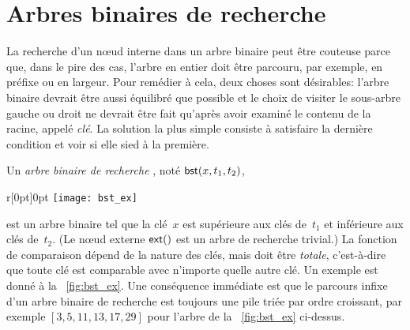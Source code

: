\chapter{Arbres binaires de recherche}

La recherche d'un n{\oe}ud interne dans un arbre binaire peut être
couteuse parce que, dans le pire des cas, l'arbre en entier doit être
parcouru, par exemple, en préfixe ou en largeur. Pour remédier à cela,
deux choses sont désirables: l'arbre binaire devrait être aussi
équilibré que possible et le
choix de visiter le sous-arbre gauche ou droit ne devrait être fait
qu'après avoir examiné le contenu de la racine, appelé
\emph{clé}. La solution la plus simple consiste à
satisfaire la dernière condition et voir si elle sied à la première.

Un \emph{arbre binaire de recherche} \citep{Mahmoud_1992}, noté \(\textsf{bst}(x, t_1,
t_2)\),
\begin{wrapfigure}[7]{r}[0pt]{0pt}
\centering
\texttt{[image: bst\_ex]}
\caption{}
\label{fig:bst_ex}
\end{wrapfigure}
est un arbre binaire tel que la clé~\(x\) est supérieure aux clés
de~\(t_1\) et inférieure aux clés de~\(t_2\). (Le n{\oe}ud externe
\(\textsf{ext}()\) est un arbre de recherche trivial.) La fonction de
comparaison dépend de la nature des clés, mais doit être
\emph{totale}, c'est-à-dire que toute clé est comparable avec
n'importe quelle autre clé. Un exemple est donné à la
\fig~\vref{fig:bst_ex}. Une conséquence immédiate est que le parcours
infixe d'un arbre binaire de
recherche est toujours une pile triée par ordre croissant, par exemple
\([3,5,11,13,17,29]\) pour l'arbre de la \fig~\ref{fig:bst_ex}
ci-dessus.

